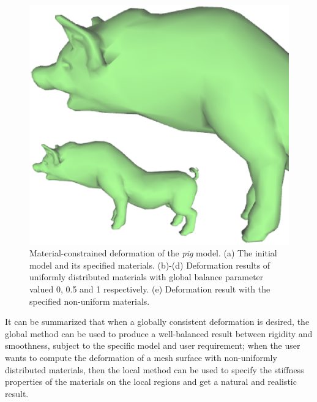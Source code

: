 \begin{figure} [htbp]
{    \label{fig:deformpig:e}
    \begin{minipage}[b]{0.23\textwidth}
      \centering
      \includegraphics[scale=0.18]{figs/f5.10.PigMat5.eps}
    \end{minipage}}
  \caption{Material-constrained deformation of the \textit{pig} model. (a) The initial model and its specified materials. (b)-(d) Deformation results of uniformly distributed materials with global balance parameter valued 0, 0.5 and 1 respectively. (e) Deformation result with the specified non-uniform materials.}
  \label{fig:deformpig} %
\end{figure}


It can be summarized that when a globally  consistent deformation is
desired, the global method can be used to produce a well-balanced
result between rigidity and smoothness, subject to the specific
model and user requirement; when the user wants to compute the
deformation of a mesh surface with non-uniformly distributed
materials, then the local method can be used to specify the
stiffness properties of the materials on the local regions and get a
natural and realistic result.


